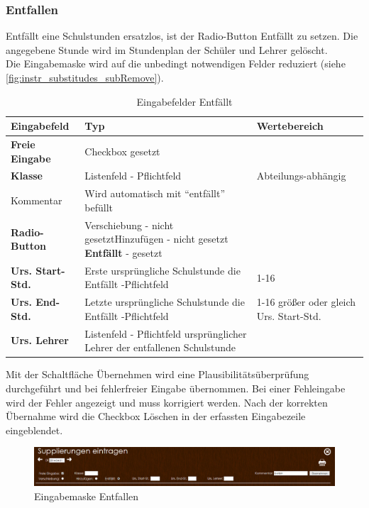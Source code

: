 \subsubsection{Entfallen}\label{sec:instr_admin_sub_remove}
Entfällt eine Schulstunden ersatzlos, ist der Radio-Button Entfällt zu setzen. Die angegebene Stunde wird im Stundenplan der Schüler und Lehrer gelöscht.\\
Die Eingabemaske wird auf die unbedingt notwendigen Felder reduziert (siehe \autoref{fig:instr_substitudes_subRemove}).
\begin{table}[H]
\centering
\begin{tabular}{p{3 cm}p{6 cm}p{5 cm}}
   \toprule
   \textbf{Eingabefeld} & \textbf{Typ} & \textbf{Wertebereich} \\
   \midrule
          \textbf{Freie Eingabe} & Checkbox \newline gesetzt & \\
          \hline
          \textbf{Klasse} & Listenfeld - Pflichtfeld & Abteilungs-abhängig \\
          \hline
          Kommentar & Wird automatisch mit \enquote{entfällt} befüllt & \\
          \hline
          \textbf{Radio-Button} & Verschiebung - nicht gesetzt\newline Hinzufügen - nicht gesetzt \newline \textbf{Entfällt} - gesetzt & \\
          \hline
          \textbf{Urs. Start-Std.} & Erste ursprüngliche Schulstunde die Entfällt  -Pflichtfeld & 1-16 \\
          \hline
          \textbf{Urs. End-Std.} & Letzte ursprüngliche Schulstunde die Entfällt  -Pflichtfeld & 1-16 \newline größer oder gleich Urs. Start-Std.\\
          \hline
          \textbf{Urs. Lehrer} & Listenfeld - Pflichtfeld \newline ursprünglicher Lehrer der entfallenen Schulstunde\\
   \bottomrule
\end{tabular}
\caption{Eingabefelder Entfällt}
\end{table}
Mit der Schaltfläche Übernehmen wird eine Plausibilitätsüberprüfung durchgeführt und bei fehlerfreier Eingabe übernommen. Bei einer Fehleingabe wird der Fehler angezeigt und muss korrigiert werden. Nach der korrekten Übernahme wird die Checkbox Löschen in der erfassten Eingabezeile eingeblendet.
\begin{figure}[H]
\centering
\includegraphics[keepaspectratio=true, width=17cm]{images/screenshots/substitudes_remove.png}
\caption{Eingabemaske Entfallen}
\label{fig:instr_substitudes_subRemove}
\end{figure}
